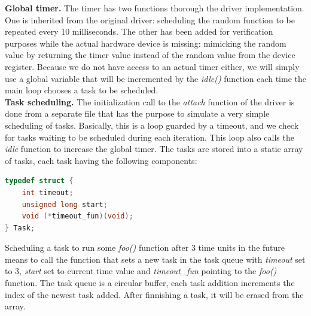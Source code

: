 \documentclass[conference]{IEEEtran}
\begin{document}
\textbf{Global timer.} The timer has two functions thorough the driver implementation. One is inherited from the original driver: scheduling the random function to be repeated every 10 milliseconds. The other has been added for verification purposes while the actual hardware device is missing: mimicking the random value by returning the timer value instead of the random value from the device register. Because we do not have access to an actual timer either, we will simply use a global variable that will be incremented by the \textit{idle()} function each time the main loop chooses a task to be scheduled.\\
\textbf{Task scheduling.} The initialization call to the \textit{attach} function of the driver is done from a separate file that has the purpose to simulate a very simple scheduling of tasks. Basically, this is a loop guarded by a timeout, and we check for tasks waiting to be scheduled during each iteration. This loop also calls the \textit{idle} function to increase the global timer. The tasks are stored into a static array of tasks, each task having the following components:
\begin{lstlisting}[language=C]
typedef struct {
    int timeout;
    unsigned long start;
    void (*timeout_fun)(void);
} Task;
\end{lstlisting}
Scheduling a task to run some \textit{foo()} function after 3 time units in the future means to call the function that sets a new task in the task queue with \textit{timeout} set to 3, \textit{start} set to current time value and \textit{timeout\_fun} pointing to the \textit{foo()} function. The task queue is a circular buffer, each task addition increments the index of the newest task added. After finnishing a task, it will be erased from the array. 
\end{document}

